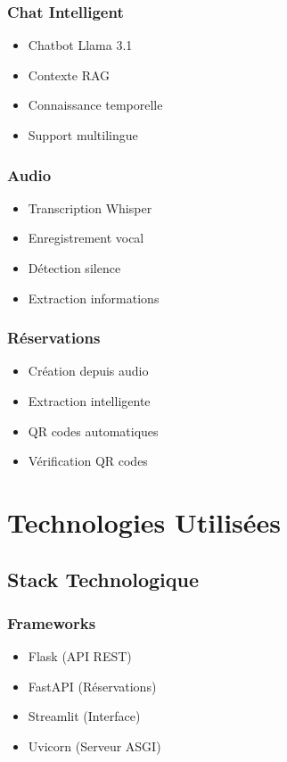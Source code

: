 \documentclass[12pt,a4paper]{article}
\begin{document}
\subsubsection{Chat Intelligent}
\begin{itemize}
    \item Chatbot Llama 3.1
    \item Contexte RAG
    \item Connaissance temporelle
    \item Support multilingue
\end{itemize}

\subsubsection{Audio}
\begin{itemize}
    \item Transcription Whisper
    \item Enregistrement vocal
    \item Détection silence
    \item Extraction informations
\end{itemize}

\subsubsection{Réservations}
\begin{itemize}
    \item Création depuis audio
    \item Extraction intelligente
    \item QR codes automatiques
    \item Vérification QR codes
\end{itemize}


\section{Technologies Utilisées}

\subsection{Stack Technologique}

\subsubsection{Frameworks}
\begin{itemize}
    \item Flask (API REST)
    \item FastAPI (Réservations)
    \item Streamlit (Interface)
    \item Uvicorn (Serveur ASGI)
\end{itemize}
\end{document}
